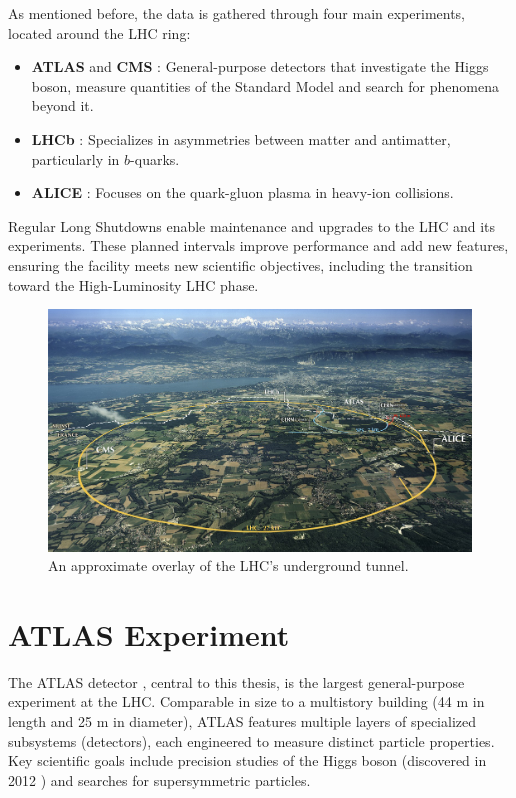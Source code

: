 As mentioned before, the data is gathered through four main experiments, located around the \acs{LHC} ring:
\begin{itemize}
    \item \textbf{ATLAS} \cite{atlas-experiment} and \textbf{CMS} \cite{cms-experiment}: General-purpose detectors that investigate the Higgs boson, measure quantities of the Standard Model and search for phenomena beyond it.
    \item \textbf{LHCb} \cite{lhcb-experiment}: Specializes in asymmetries between matter and antimatter, particularly in $b$-quarks. 
    \item \textbf{ALICE} \cite{alice-experiment}: Focuses on the quark-gluon plasma in heavy-ion collisions.
\end{itemize}

Regular Long Shutdowns enable maintenance and upgrades to the \acs{LHC} and its experiments. These planned intervals improve performance and add new features, ensuring the facility meets new scientific objectives, including the transition toward the High-Luminosity \acs{LHC} phase.

\begin{figure}[H]
\centering
\includegraphics[width=\textwidth]{images/introduction/LHC_map.jpg}
\caption{An approximate overlay of the \acs{LHC}'s underground tunnel. \protect\cite{lhc_tunnel_map}}
\label{fig:LHC}
\end{figure}

\clearpage
\section{ATLAS Experiment}

The \acs{ATLAS} detector \cite{atlas-experiment}, central to this thesis, is the largest general-purpose experiment at the \acs{LHC}. Comparable in size to a multistory building (44 m in length and 25 m in diameter), \acs{ATLAS} features multiple layers of specialized subsystems (detectors), each engineered to measure distinct particle properties. Key scientific goals include precision studies of the Higgs boson (discovered in 2012 \cite{atlas-higgs-discovery}) and searches for supersymmetric particles.

